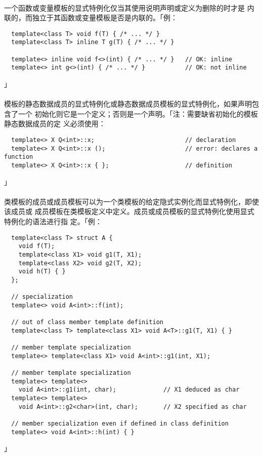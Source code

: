 \paragraph{}
一个函数或变量模板的显式特例化仅当其使用说明声明或定义为删除的时才是
内联的，而独立于其函数或变量模板是否是内联的。「例：
\begin{lstlisting}
  template<class T> void f(T) { /* ... */ }
  template<class T> inline T g(T) { /* ... */ }

  template<> inline void f<>(int) { /* ... */ }   // OK: inline
  template<> int g<>(int) { /* ... */ }           // OK: not inline
\end{lstlisting}」

\paragraph{}
模板的静态数据成员的显式特例化或静态数据成员模板的显式特例化，如果声明包含了一个
初始化则它是一个定义；否则是一个声明。「注：需要缺省初始化的模板静态数据成员的定
义必须使用：
\begin{lstlisting}
  template<> X Q<int>::x;                         // declaration
  template<> X Q<int>::x ();                      // error: declares a function
  template<> X Q<int>::x { };                     // definition
\end{lstlisting}」

\paragraph{}
类模板的成员或成员模板可以为一个类模板的给定隐式实例化而显式特例化，即使该成员或
成员模板在类模板定义中定义。成员或成员模板的显式特例化使用显式特例化的语法进行指
定。「例：
\begin{lstlisting}
  template<class T> struct A {
    void f(T);
    template<class X1> void g1(T, X1);
    template<class X2> void g2(T, X2);
    void h(T) { }
  };

  // specialization
  template<> void A<int>::f(int);

  // out of class member template definition
  template<class T> template<class X1> void A<T>::g1(T, X1) { }

  // member template specialization
  template<> template<class X1> void A<int>::g1(int, X1);

  // member template specialization
  template<> template<>
    void A<int>::g1(int, char);             // X1 deduced as char
  template<> template<>
    void A<int>::g2<char>(int, char);       // X2 specified as char

  // member specialization even if defined in class definition
  template<> void A<int>::h(int) { }
\end{lstlisting}」

